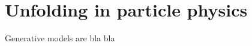 %
%
%

\chapter{Unfolding in particle physics}\label{chap:unfolding}
\enlargethispage{2ex}
\vspace*{-2pt}

\enlargethispage{2ex}

Generative models are bla bla

%
